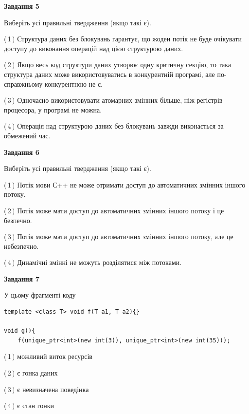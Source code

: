 \documentclass[12pt, ukrainian]{article}
\begin{document}
\begin {large}
{\begin{center}
\textbf{Завдання 5}
\end{center}

Виберіть усі правильні твердження (якщо такі є).\par
\vspace{2mm}

(\,1\,) Структура даних без блокувань гарантує, що жоден потік не буде очікувати доступу до виконання операцій над цією структурою даних.%

(\,2\,) Якщо весь код структури даних утворює одну критичну секцію, то така структура даних може використовуватись в конкурентній програмі, але по-справжньо\-му конкурентною не є.%

(\,3\,) Одночасно використовувати атомарних змінних більше, ніж регістрів процесора, у програмі не можна.%

(\,4\,) Операція над структурою даних без блокувань завжди виконається за обмежений час.%
\newpage


\begin{center}
\textbf{Завдання 6}
\end{center}

Виберіть усі правильні твердження (якщо такі є).\par
\vspace{2mm}

(\,1\,) Потік мови С++ не може отримати доступ до автоматичних змінних іншого потоку.%

(\,2\,) Потік може мати доступ до автоматичних змінних іншого потоку і це безпечно.%

(\,3\,) Потік може мати доступ до автоматичних змінних іншого потоку, але це небезпечно.%

(\,4\,) Динамічні змінні не можуть розділятися між потоками.%


\begin{center}
\textbf{Завдання 7}
\end{center}

У цьому фрагменті коду
\begin{verbatim}
template <class T> void f(T a1, T a2){}

void g(){
    f(unique_ptr<int>(new int(3)), unique_ptr<int>(new int(35)));
\end{verbatim}

(\,1\,) можливий виток ресурсів%

(\,2\,) є гонка даних%

(\,3\,) є невизначена поведінка%

(\,4\,) є стан гонки%

}
\end {large}

\vspace{4mm}
\newpage
\end{document}
